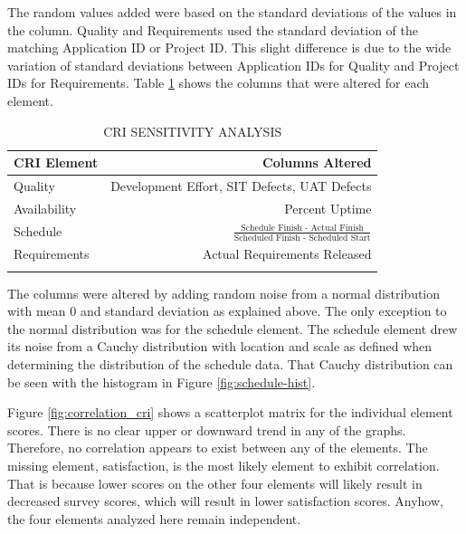 \documentclass[SDSUThesis.tex]{subfiles}
\begin{document}
        The random values added were based on the standard 
        deviations of the values in the column.
        Quality and Requirements used the standard deviation of the
        matching Application ID or Project ID.  This slight difference
        is due to the wide variation of standard deviations between
        Application IDs for Quality and Project IDs for Requirements. 
        Table \ref{tab:sensitivity} shows the columns that were
        altered for each element.  
        
        \begin{longtable}{@{}l r}
            \toprule%
             \centering%
             {\bfseries CRI Element}
             & {\bfseries Columns Altered } \\
            
            \cmidrule[0.2pt](r{0.125em}){1-1}%
            \cmidrule[0.2pt](r{0.125em}){2-2}%
            \endhead
            
            Quality  & Development Effort, SIT Defects, UAT Defects \\
            \myrowcolour%
            Availability & Percent Uptime \\
            Schedule &  $\frac{\text{Schedule Finish - Actual Finish}}
                    {\text{Scheduled Finish - Scheduled Start}}$ \\
            \myrowcolour%
            Requirements & Actual Requirements Released \\
            
            \bottomrule
            
            \caption{CRI SENSITIVITY ANALYSIS}
            \label{tab:sensitivity}
        \end{longtable}
        
        The columns were altered by adding
        random noise from a normal distribution with mean 0 and standard
        deviation as explained above.  The only exception to the normal
        distribution was for the schedule element.  The schedule element
        drew its noise from a Cauchy distribution with location and scale
        as defined when determining the distribution of the schedule data.
        That Cauchy distribution can be seen with the histogram in 
        Figure \ref{fig:schedule-hist}. 
        
        Figure \ref{fig:correlation_cri} shows a scatterplot matrix
        for the individual element scores.  There
        is no clear upper or downward trend in any of the graphs.
        Therefore, no correlation appears
        to exist between any of the elements. The missing element,
        satisfaction, is the most likely element to exhibit correlation. 
        That is because lower scores on the other four elements
        will likely result in 
        decreased survey scores, which will result in lower satisfaction
        scores.  Anyhow, the four elements analyzed here remain independent.
        
\end{document}
